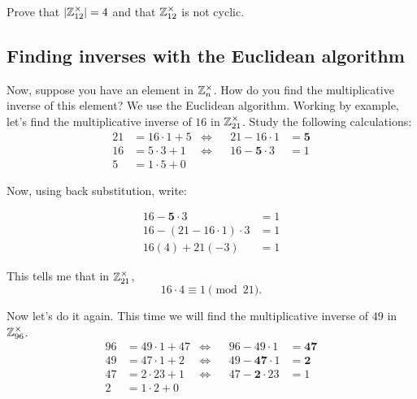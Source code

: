 \documentclass{ximera}
\begin{document}
\begin{exercise}
  Prove that $|\mathbb Z^\times_{12}| = 4$ and that $\mathbb Z^\times_{12}$ is not
  cyclic.
\end{exercise}








\subsection{Finding inverses with the Euclidean algorithm}



Now, suppose you have an element in $\mathbb Z_n^\times$. How do you find the
multiplicative inverse of this element? We use the Euclidean
algorithm. Working by example, let's find
the multiplicative inverse of $16$ in $\mathbb Z_{21}^\times$. Study
the following calculations:
\begin{align*}
  21 &= 16\cdot 1 + 5 &\Leftrightarrow & &                21-16\cdot 1 &= \boldsymbol{5}\\ 
  16 &= 5\cdot 3 + 1 &\Leftrightarrow  & &   16 - \boldsymbol{5}\cdot 3 &= 1\\ 
  5 &= 1 \cdot 5 + 0 &  & & &
\end{align*}

Now, using back substitution, write:

\begin{align*}
16 - \boldsymbol{5}\cdot 3 &= 1 \\
16 - (21-16\cdot 1)\cdot 3 &= 1 \\
16(4) + 21(-3) &= 1
\end{align*}

This tells me that in $\mathbb Z_{21}^\times$,
\[
16\cdot 4 \equiv 1 \pmod{21}.
\]


Now let's do it again. This time we will find the multiplicative
inverse of $49$ in $\mathbb Z_{96}^\times$.
\begin{align*}
  96 &= 49\cdot 1 + 47 &\Leftrightarrow  & &                96 - 49\cdot 1 &= \boldsymbol{47}\\ 
  49 &= 47\cdot 1 + 2  &\Leftrightarrow  & &   49 - \boldsymbol{47}\cdot 1 &= \boldsymbol{2}\\ 
  47 &= 2 \cdot 23 + 1 &\Leftrightarrow  & &   47 - \boldsymbol{2}\cdot 23 &= 1 \\
  2 &= 1\cdot  2+ 0 & & & & 
\end{align*}
\end{document}
